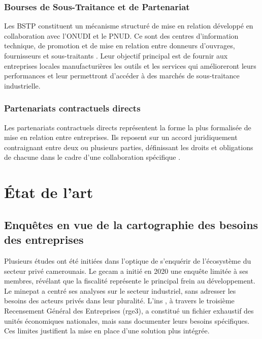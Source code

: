 \documentclass[12pt, a4paper, oneside]{report}
\begin{document}
\subsubsection{Bourses de Sous-Traitance et de Partenariat}

Les BSTP constituent un mécanisme structuré de mise en relation développé en collaboration avec l'ONUDI et le PNUD. Ce sont des centres d'information technique, de promotion et de mise en relation entre donneurs d'ouvrages, fournisseurs et sous-traitants \cite{minpmeesa}. Leur objectif principal est de fournir aux entreprises locales manufacturières les outils et les services qui amélioreront leurs performances et leur permettront d'accéder à des marchés de sous-traitance industrielle.

\subsubsection{Partenariats contractuels directs}

Les partenariats contractuels directs représentent la forme la plus formalisée de mise en relation entre entreprises. Ils reposent sur un accord juridiquement contraignant entre deux ou plusieurs parties, définissant les droits et obligations de chacune dans le cadre d'une collaboration spécifique \cite{williamson1985}.

\section{État de l'art}
\label{sec:etat_art}

\subsection{Enquêtes en vue de la cartographie des besoins des entreprises}

Plusieurs études ont été initiées dans l'optique de s'enquérir de l'écosystème du secteur privé camerounais. Le \gls{gecam} \cite{gecam2019} a initié en 2020 une enquête limitée à ses membres, révélant que la fiscalité représente le principal frein au développement. Le \gls{minepat} \cite{minepat2022} a centré ses analyses sur le secteur industriel, sans adresser les besoins des acteurs privés dans leur pluralité. L'\gls{ins} \cite{ins2023}, à travers le troisième Recensement Général des Entreprises (\gls{rge}3), a constitué un fichier exhaustif des unités économiques nationales, mais sans documenter leurs besoins spécifiques. Ces limites justifient la mise en place d'une solution plus intégrée.
\end{document}
